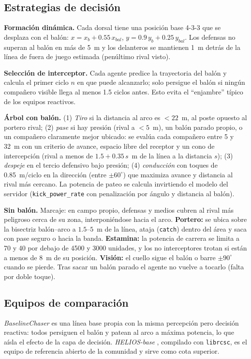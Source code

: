 \documentclass[conference,10pt]{IEEEtran}
\begin{document}
\subsection{Estrategias de decisión}
\textbf{Formación dinámica.} Cada dorsal tiene una posición base 4-3-3 que se
desplaza con el balón: $x=x_b+0.55\,x_{bal}$, $y=0.9\,y_b+0.25\,y_{bal}$. Los
defensas no superan al balón en más de 5~m y los delanteros se mantienen
1~m detrás de la línea de fuera de juego estimada (penúltimo rival visto).

\textbf{Selección de interceptor.} Cada agente predice la trayectoria del
balón y calcula el primer ciclo $n$ en que puede alcanzarlo; solo persigue el
balón si ningún compañero visible llega al menos 1.5 ciclos antes. Esto evita
el ``enjambre'' típico de los equipos reactivos.

\textbf{Árbol con balón.} (1) \emph{Tiro} si la distancia al arco es
$<22$~m, al poste opuesto al portero rival; (2) \emph{pase} si hay presión
(rival a $<5$~m), un balón parado propio, o un compañero claramente mejor
ubicado: se evalúa cada compañero entre 5 y 32~m con un criterio de avance,
espacio libre del receptor y un cono de intercepción (rival a menos de
$1.5+0.35\,s$~m de la línea a la distancia $s$); (3) \emph{despeje} en el
tercio defensivo bajo presión; (4) \emph{conducción} con toques de
0.85~m/ciclo en la dirección (entre $\pm60^\circ$) que maximiza avance y
distancia al rival más cercano. La potencia de pateo se calcula invirtiendo el
modelo del servidor (\texttt{kick\_power\_rate} con penalización por ángulo y
distancia al balón).

\textbf{Sin balón.} Marcaje: en campo propio, defensas y medios cubren al
rival más peligroso cerca de su zona, interponiéndose hacia el arco.
\textbf{Portero:} se ubica sobre la bisectriz balón--arco a $1.5$--$5$~m de
la línea, ataja (\texttt{catch}) dentro del área y saca con pase seguro o hacia
la banda. \textbf{Estamina:} la potencia de carrera se limita a 70 y 40 por
debajo de 4500 y 3000 unidades, y los no interceptores trotan si están a
menos de 8~m de su posición. \textbf{Visión:} el cuello sigue el balón o
barre $\pm90^\circ$ cuando se pierde. Tras sacar un balón parado el agente no
vuelve a tocarlo (falta por doble toque).

\subsection{Equipos de comparación}
\emph{BaselineChaser} es una línea base propia con la misma percepción pero
decisión reactiva: todos persiguen el balón y patean al arco a máxima
potencia, lo que aísla el efecto de la capa de decisión.
\emph{HELIOS-base} \cite{helios}, compilado con \texttt{librcsc}, es el equipo
de referencia abierto de la comunidad y sirve como cota superior.
\end{document}
